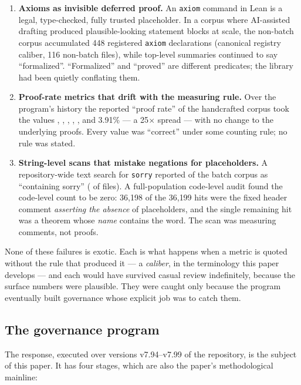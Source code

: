 \begin{enumerate}
\item[\textbf{F1}] \textbf{Axioms as invisible deferred proof.}
An \texttt{axiom} command in Lean is a legal, type-checked, fully
trusted placeholder. In a corpus where AI-assisted drafting produced
plausible-looking statement blocks at scale, the non-batch corpus
accumulated 448 registered \texttt{axiom} declarations (canonical
registry caliber, 116 non-batch files), while top-level summaries
continued to say ``formalized''. ``Formalized'' and ``proved'' are
different predicates; the library had been quietly conflating them.
\item[\textbf{F2}] \textbf{Proof-rate metrics that drift with the
measuring rule.} Over the program's history the reported
``proof rate'' of the handcrafted corpus took the values
, , , ,
, and 3.91\% --- a 25$\times$ spread --- with no change
to the underlying proofs. Every value was ``correct'' under some
counting rule; no rule was stated.
\item[\textbf{F3}] \textbf{String-level scans that mistake
negations for placeholders.} A repository-wide text search for
\texttt{sorry} reported  of the batch corpus as
``containing sorry'' ( of  files). A
full-population code-level audit found the code-level count to be
zero: 36{,}198 of the 36{,}199 hits were the fixed header comment
\emph{asserting the absence} of placeholders, and the single
remaining hit was a theorem whose \emph{name} contains the word.
The scan was measuring comments, not proofs.
\end{enumerate}

None of these failures is exotic. Each is what happens when a metric
is quoted without the rule that produced it --- a \emph{caliber}, in
the terminology this paper develops --- and each would have survived
casual review indefinitely, because the surface numbers were
plausible. They were caught only because the program eventually
built governance whose explicit job was to catch them.

\subsection{The governance program}
\label{sec:program}
The response, executed over versions v7.94--v7.99 of the repository,
is the subject of this paper. It has four stages, which are also the
paper's methodological mainline:

